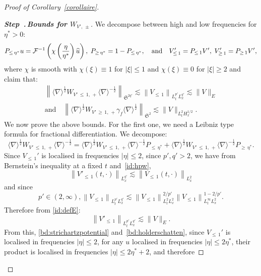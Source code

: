 \documentclass[AHL, Unicode, longabstracts,published]{cedram}
\newcommand{\mclF}{\mathcal{F}}
\newcommand{\frkS}{\mathfrak{S}}
\newcounter{stepcount}
\newenvironment{step}[1]{\refstepcounter{stepcount}\begin{proof}[{\bf{Step~\thestepcount}{.\,\emph{#1}}}]}{\let\qed\relax\end{proof}}
\let\oldhat\hat
\renewcommand*{\hat}[1]{\mathchoice{\widehat{#1}}{\widehat{#1}}{\oldhat{#1}}{\oldhat{#1}}}
\begin{document}
\begin{proof}[Proof of Corollary~\ref{corollaire}]
\vspace{4pt}
\begin{step}{{Bounds for $W_{V',\,\pm}$}}\label{proofcoro1.2step2}
We decompose between high and low frequencies for $\eta^*>0$:
\[
P_{\leq\,\eta^*}u=\mclF^{-1} \left(\chi \left(\frac{\eta}{\eta^*}\right)\hat u\right), \; P_{\geq\,\eta^*}=1-P_{\leq\,\eta^*}, \quad \text{and}\quad V'_{\leq\,1}=P_{\leq\,1}V', \; V'_{\geq\,1}=P_{\geq\,1}V',
\]
where $\chi$ is smooth with $\chi(\xi)\equiv 1$ for $|\xi|\leq 1$ and $\chi(\xi)\equiv 0$ for $|\xi|\geq 2$ and claim that:
\begin{multline} \label{bd:WVlocalised}
\left\| \langle \nabla \rangle^{\frac 12} W_{V'\,\leq\, 1,\,+}\langle \nabla \rangle^{-\frac 12}\right\|_{\frkS^{2q'}}\lesssim \left\| V_{\leq\,1}\right\|_{L^{p'}_tL^{q'}_{x}}\lesssim \| V \|_{E}\\
 \text{and} \quad \left\| \langle \nabla \rangle^{\frac 12} W_{V'\,\geq\,1,\,+} \gamma_f \langle \nabla \rangle^{\frac 12}\right\|_{\frkS^{2}}\lesssim \| V \|_{L^2_tH^{1/2}_x}.
\end{multline}
We now prove the above bounds. For the first one, we need a Leibniz type formula for fractional differentiation. We decompose:
\begin{equation} \label{id:decompositionWVleq1}
\langle \nabla \rangle^{\frac 12} W_{V'\,\leq\,1,\,+}\langle \nabla \rangle^{-\frac 12}=\langle \nabla \rangle^{\frac 12} W_{V'\,\leq\,1,\,+}\langle \nabla \rangle^{-\frac 12}P_{\leq\,\eta^*}+\langle \nabla \rangle^{\frac 12} W_{V'\,\leq\,1,\,+}\langle \nabla \rangle^{-\frac 12}P_{\geq\,\eta^*}.
\end{equation} Since $V_{\leq\,1}'$ is localised in frequencies $|\eta|\leq 2$, since $p',q'>2$, we have from Bernstein's inequality at a fixed $t$ and~\eqref{id:hpw},
\[
\left\|V'_{\leq\,1}(t,\cdot)\right\|_{L^{q'}_x} \lesssim \left\|V_{\leq\,1}(t,\cdot)\right\|_{L^2_x}
\]
and since
\[
p' \in (2,\infty), \left\| V_{\leq\,1} \right\|_{L^{p'}_tL^{q'}_x}\lesssim \left\| V_{\leq\,1} \right\|_{L^{2}_tL^{2}_x}^{2/p'}\left\| V_{\leq\,1} \right\|_{L^{\infty}_tL^{2}_x}^{1-2/p'}.
\]
Therefore from \eqref{id:defE}:
\begin{equation} \label{bd:Vlocalisedstrichartz}
\left\| V'_{\leq\,1}\right\|_{L^{p'}_tL^{q'}_x}\lesssim \| V \|_{E}.
\end{equation} From this, \eqref{bd:strichartzpotential} and~\eqref{bd:holderschatten}, since $V_{\leq\,1}'$ is localised in frequencies $|\eta|\leq 2$, for any $u$ localised in frequencies $|\eta| \leq 2\eta^*$, their product is localised in frequencies $|\eta| \leq 2\eta^* + 2$, and therefore


\end{step}
\end{proof}
\end{document}
